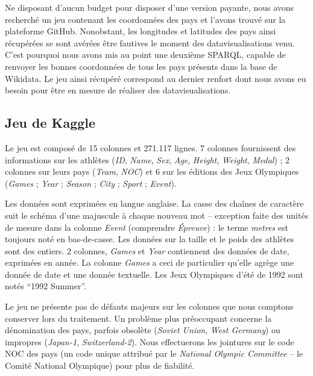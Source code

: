 \documentclass[hidelinks, 12pt]{report}
\begin{document}
Ne disposant d'aucun budget pour disposer d'une version payante, nous avons recherché un jeu contenant les coordonnées des pays et l'avons trouvé sur la plateforme GitHub\autocite{github}. Nonobstant, les longitudes et latitudes des pays ainsi récupérées se sont avérées être fautives le moment des datavisualisations venu. C'est pourquoi nous avons mis au point une deuxième SPARQL, capable de renvoyer les bonnes coordonnées de tous les pays présents dans la base de Wikidata\autocite{wikiquerycoor}. Le jeu ainsi récupéré correspond au dernier renfort dont nous avons eu besoin pour être en mesure de réaliser des datavisualisations.





%





\subsection{Jeu de Kaggle}

Le jeu est composé de 15 colonnes et 271.117 lignes. 7 colonnes fournissent des informations sur les athlètes (\textit{ID}, \textit{Name}, \textit{Sex}, \textit{Age}, \textit{Height}, \textit{Weight}, \textit{Medal}) ; 2 colonnes sur leurs pays (\textit{Team}, \textit{NOC}) et 6 sur les éditions des Jeux Olympiques (\textit{Games} ; \textit{Year} ; \textit{Season} ; \textit{City} ; \textit{Sport} ; \textit{Event}).

Les données sont exprimées en langue anglaise. La casse des chaînes de caractère suit le schéma d'une majuscule à chaque nouveau mot -- exception faite des unités de mesure dans la colonne \textit{Event} (comprendre \textit{Épreuve}) : le terme \textit{metres} est toujours noté en bas-de-casse. Les données sur la taille et le poids des athlètes sont des entiers. 2 colonnes, \textit{Games} et \textit{Year} contiennent des données de date, exprimées en année. La colonne \textit{Games} a ceci de particulier qu'elle agrège une donnée de date et une donnée textuelle. Les Jeux Olympiques d'été de 1992 sont notés \enquote{1992 Summer}.

Le jeu ne présente pas de défauts majeurs sur les colonnes que nous comptons conserver lors du traitement. Un problème plus préoccupant concerne la dénomination des pays, parfois obsolète (\textit{Soviet Union}, \textit{West Germany}) ou impropres (\textit{Japan-1}, \textit{Switzerland-2}). Nous effectuerons les jointures sur le code NOC des pays (un code unique attribué par le \textit{National Olympic Committee} -- le Comité National Olympique) pour plus de fiabilité.
\end{document}
